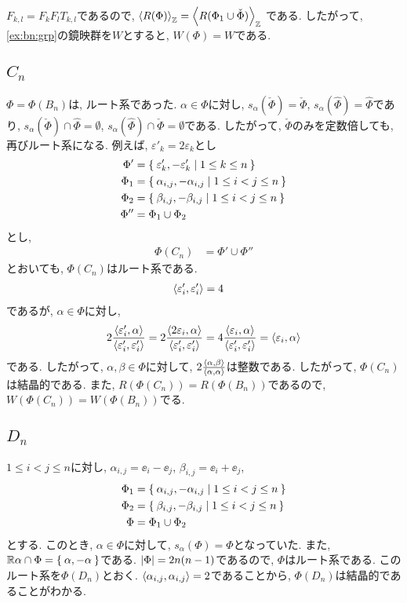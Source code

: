 $F_{k,l}=F_kF_lT_{k,l}$であるので,
$\Braket{R(\Phi)}_{\mathbb{Z}}=\Braket{R(\Phi_1\cup \check{\Phi})}_{\mathbb{Z}}$
である.
したがって,
\cref{ex:bn:grp}の鏡映群を$W$とすると,
$W(\Phi)=W$である.

\subsection{$C_{n}$}
\label{ex:cn:root}
$\Phi=\Phi(B_n)$は,
ルート系であった.
$\alpha\in \Phi$に対し,
$s_{\alpha}(\check\Phi)=\check\Phi$,
$s_{\alpha}(\hat\Phi)=\hat\Phi$であり,
$s_{\alpha}(\check\Phi)\cap\hat\Phi=\emptyset$,
$s_{\alpha}(\hat\Phi)\cap\check\Phi=\emptyset$である.
したがって, $\check\Phi$のみを定数倍しても,
再びルート系になる.
例えば, $\varepsilon'_k=2\varepsilon_k$とし
\begin{align*}
  \Phi'&=\Set{\varepsilon'_k,-\varepsilon'_k|1\leq k\leq n}\\
  \Phi_1&=\Set{\alpha_{i,j},-\alpha_{i,j}|1\leq i<j\leq n}\\
  \Phi_2&=\Set{\beta_{i,j},-\beta_{i,j}|1\leq i<j\leq n}\\
  \Phi''&=\Phi_1\cup \Phi_2
\end{align*}
とし,
\begin{align*}
  \Phi(C_n)&=\Phi'\cup\Phi''
\end{align*}
とおいても, $\Phi(C_n)$はルート系である.
\begin{align*}
  \Braket{\varepsilon'_{i},\varepsilon'_{i}}&=4
\end{align*}
であるが, $\alpha\in\Phi$に対し,
\begin{align*}
  2\frac{\Braket{\varepsilon'_{i},\alpha}}{\Braket{\varepsilon'_{i},\varepsilon'_{i}}}=2\frac{\Braket{2\varepsilon_{i},\alpha}}{\Braket{\varepsilon'_{i},\varepsilon'_{i}}}
  =4\frac{\Braket{\varepsilon_{i},\alpha}}{\Braket{\varepsilon'_{i},\varepsilon'_{i}}}=\Braket{\varepsilon_{i},\alpha}
\end{align*}
である.  したがって,
$\alpha,\beta\in\Phi$に対して,
$2\frac{\Braket{\alpha,\beta}}{\Braket{\alpha,\alpha}}$は整数である.
したがって,
$\Phi(C_{n})$は結晶的である.
また,
$R(\Phi(C_n))=R(\Phi(B_n))$であるので,
$W(\Phi(C_n))=W(\Phi(B_n))$でる.


\subsection{$D_{n}$}
\label{ex:dn:root}
$1\leq i<j\leq n$に対し,
$\alpha_{i,j}=\ee_i-\ee_j$,
$\beta_{i,j}=\ee_i+\ee_j$,
\begin{align*}
  \Phi_1&=\Set{\alpha_{i,j},-\alpha_{i,j}|1\leq i<j\leq n}\\
  \Phi_2&=\Set{\beta_{i,j},-\beta_{i,j}|1\leq i<j\leq n}\\
  \Phi&=\Phi_1\cup \Phi_2
\end{align*}
とする.
このとき,
$\alpha\in \Phi$に対して,
$s_\alpha(\Phi)=\Phi$となっていた.
また,
$\mathbb{R}\alpha\cap\Phi=\Set{\alpha,-\alpha}$である.
$\left|\Phi\right|=2n(n-1)$であるので,
$\Phi$はルート系である.
このルート系を$\Phi(D_{n})$とおく.
$\Braket{\alpha_{i,j},\alpha_{i,j}}=2$であることから,
$\Phi(D_{n})$は結晶的であることがわかる.

